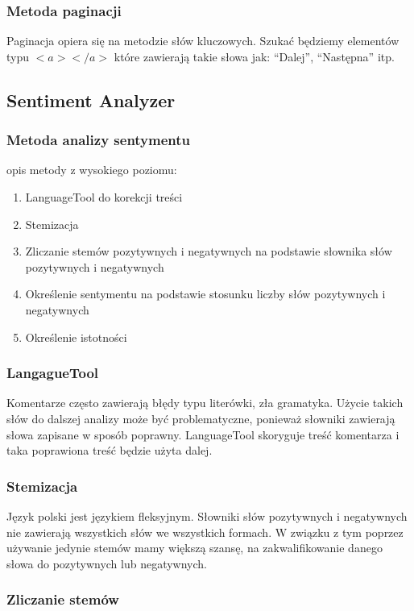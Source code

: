 \documentclass[12pt, a4paper]{article}
\begin{document}
\subsubsection{Metoda paginacji}
Paginacja opiera się na metodzie słów kluczowych. Szukać będziemy elementów typu $<a></a>$ które zawierają takie słowa jak: “Dalej”, “Następna” itp.

\subsection{Sentiment Analyzer}

\subsubsection{Metoda analizy sentymentu}

opis metody z wysokiego poziomu:
\begin{enumerate}
\item LanguageTool do korekcji treści
\item Stemizacja
\item Zliczanie stemów pozytywnych i negatywnych na podstawie słownika słów pozytywnych i negatywnych
\item Określenie sentymentu na podstawie stosunku liczby słów pozytywnych i negatywnych
\item Określenie istotności
\end{enumerate}

\subsubsection{LangagueTool}
Komentarze często zawierają błędy typu literówki, zła gramatyka. Użycie takich słów do dalszej analizy może być problematyczne, ponieważ słowniki zawierają słowa zapisane w sposób poprawny. LanguageTool skoryguje treść komentarza i taka poprawiona treść będzie użyta dalej.

\subsubsection{Stemizacja}
Język polski jest językiem fleksyjnym. Słowniki słów pozytywnych i negatywnych nie zawierają wszystkich słów we wszystkich formach. W związku z tym poprzez używanie jedynie stemów mamy większą szansę, na zakwalifikowanie danego słowa do pozytywnych lub negatywnych.

\subsubsection{Zliczanie stemów}
\end{document}
